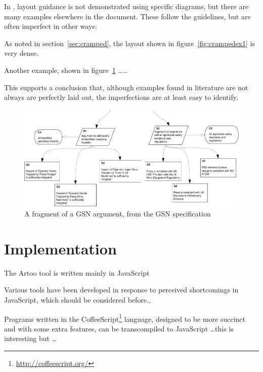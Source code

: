 In \cite{gsnstandard}, layout guidance is not demonstrated using specific diagrams, but there are many examples elsewhere in the document. These follow the guidelines, but are often imperfect in other ways:

\begin{itemize*}
    \item As noted in section~\ref{sec:cramped}, the layout shown in figure~\ref{fig:crampedex1} is very dense.
    \item Another example, shown in figure~\ref{fig:unalignedsiblings} \ldots \ldots
\end{itemize*}

This supports a conclusion that, although examples found in literature are not always are perfectly laid out, the imperfections are at least easy to identify.

\begin{figure}
    \includegraphics[width=\textwidth]{graphics/unaligned_siblings.pdf}
    \caption{A fragment of a GSN argument,
            from the GSN specification \citep[figure~42, section~2.3.6.5, pp.~34]{gsnstandard}}
    \label{fig:unalignedsiblings}
\end{figure}








\section{Implementation}

The Artoo tool is written mainly in JavaScript 

Various tools have been developed in response to perceived shortcomings in JavaScript, which should be considered before., 

Programs written in the CoffeeScript\footnote{\url{http://coffeescript.org/}} language, designed to be more succinct and with some extra features, can be transcompiled to JavaScript \ldots this is interesting but \ldots

